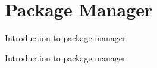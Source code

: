 \section{Package Manager}

\begin{frame}[fragile]{Introduction to package manager}

\end{frame}
	

\begin{frame}[fragile]{Introduction to package manager}

\end{frame}
